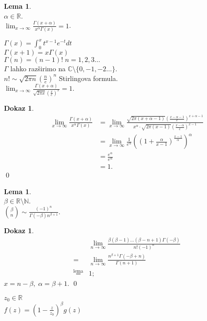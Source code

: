 \documentclass[a4paper, 12pt]{book}
\theoremstyle{definition}
\newtheorem{lemma}[counter]{Lema}
\newtheorem{pro}[counter]{Dokaz}
\theoremstyle{remark}
\newcommand{\N}{\mathbb{N}}
\newcommand{\R}{\mathbb{R}}
\newcommand{\C}{\mathbb{C}}
\begin{document}
\begin{lemma} \text{} \\
  $\alpha \in \R$. \\
  $\lim_{x \to \infty} \frac{\Gamma(x + \alpha)}{x^{\alpha} \Gamma(x)} = 1$.
\end{lemma}
$\Gamma(x) = \int_{0}^{x} t^{x-1} e^{-t} dt$ \\
$\Gamma(x+1) = x \Gamma(x)$ \\
$\Gamma(n) = (n-1)! \; n = 1, 2, 3 \dots$ \\
$\Gamma$ lahko razširimo na $\C \setminus \{0, -1, -2 \dots\}$. \\
$n! \sim \sqrt{2 \pi n} \left(\frac{n}{e}\right)^n$ Stirlingova formula. \\
$\lim_{x \to \infty} \frac{\Gamma(x + \alpha)}{\sqrt{2 \pi x} \left(\frac{x}{e}\right)^x} = 1$.
\begin{pro}
  \begin{align*}
    \lim_{x \to \infty} \frac{\Gamma(x + \alpha)}{x^{\alpha} \Gamma(x)}
    &= \lim_{x \to \infty} \frac
      {\sqrt{2 \pi (x+\alpha-1)} \left(\frac{x-\alpha-1}{e}\right)^{x+\alpha-1}}
      {x^{\alpha} \cdot \sqrt{2 \pi (x-1)} \left(\frac{x-\alpha}{e}\right)^{x-1}} \\
    &= \lim_{x \to \infty} \frac{1}{e^{\alpha}}
      \left(\left(1 + \frac{\alpha}{x-1}\right)^{\frac{x-1}{\alpha}}\right)^{\alpha} \\
    &= \frac{e^{\alpha}}{e^{\alpha}} \\
    &= 1.
  \end{align*}
  \qed
\end{pro}
\begin{lemma} \text{} \\
  $\beta \in \R \setminus \N$. \\
  $\binom{\beta}{n} \sim \frac{(-1)^n}{\Gamma(-\beta) n^{\beta+1}}$.
\end{lemma}
\begin{pro}
  \begin{align*}
    &\lim_{n \to \infty} \frac{\beta (\beta-1) \dots (\beta-n+1) \Gamma(-\beta)}{n! (-1)^n} \\
    =& \lim_{n \to \infty} \frac{n^{\beta+1} \Gamma(-\beta+n)}{\Gamma(n+1)} \\
    \stackrel{\text{lema}}{=}& 1;
  \end{align*}
  $x = n - \beta, \; \alpha = \beta + 1$.
  \qed
\end{pro}
$z_0 \in \R$ \\
$f(z) = \left(1 - \frac{z}{z_0}\right)^{\beta} g(z)$ \\
\end{document}
